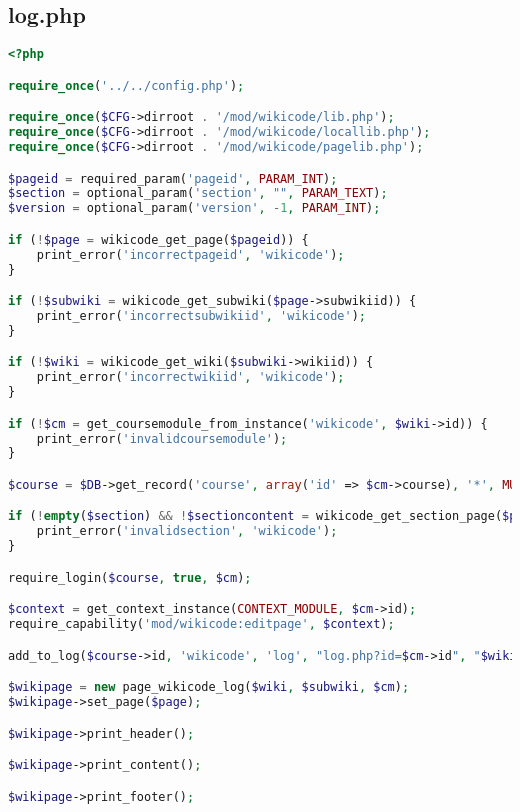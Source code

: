 \subsection{log.php}
\begin{lstlisting}[language=PHP]
<?php

require_once('../../config.php');

require_once($CFG->dirroot . '/mod/wikicode/lib.php');
require_once($CFG->dirroot . '/mod/wikicode/locallib.php');
require_once($CFG->dirroot . '/mod/wikicode/pagelib.php');

$pageid = required_param('pageid', PARAM_INT);
$section = optional_param('section', "", PARAM_TEXT);
$version = optional_param('version', -1, PARAM_INT);

if (!$page = wikicode_get_page($pageid)) {
    print_error('incorrectpageid', 'wikicode');
}

if (!$subwiki = wikicode_get_subwiki($page->subwikiid)) {
    print_error('incorrectsubwikiid', 'wikicode');
}

if (!$wiki = wikicode_get_wiki($subwiki->wikiid)) {
    print_error('incorrectwikiid', 'wikicode');
}

if (!$cm = get_coursemodule_from_instance('wikicode', $wiki->id)) {
    print_error('invalidcoursemodule');
}

$course = $DB->get_record('course', array('id' => $cm->course), '*', MUST_EXIST);

if (!empty($section) && !$sectioncontent = wikicode_get_section_page($page, $section)) {
    print_error('invalidsection', 'wikicode');
}

require_login($course, true, $cm);

$context = get_context_instance(CONTEXT_MODULE, $cm->id);
require_capability('mod/wikicode:editpage', $context);

add_to_log($course->id, 'wikicode', 'log', "log.php?id=$cm->id", "$wiki->id");

$wikipage = new page_wikicode_log($wiki, $subwiki, $cm);
$wikipage->set_page($page);

$wikipage->print_header();

$wikipage->print_content();

$wikipage->print_footer();
\end{lstlisting}

